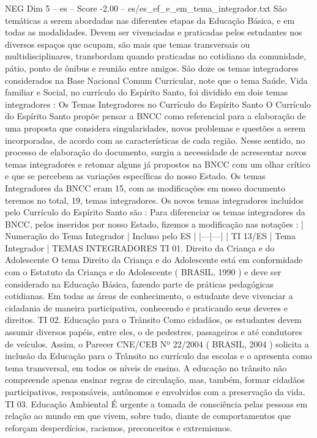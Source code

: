 \begin{textsample}{NEG Dim 5 – es – Score -2.00 – es/es\_ef\_e\_em\_tema\_integrador.txt}
São temáticas a serem abordadas nas diferentes etapas da Educação Básica, e em todas as modalidades.
Devem ser vivenciadas e praticadas pelos estudantes nos diversos espaços que ocupam, são mais que temas transversais ou multidisciplinares, transbordam quando praticadas no cotidiano da comunidade, pátio, ponto de ônibus e reunião entre amigos.
São doze os temas integradores considerados na Base Nacional Comum Curricular, note que o tema Saúde, Vida familiar e Social, no currículo do Espírito Santo, foi dividido em dois temas integradores : Os Temas Integradores no Currículo do Espírito Santo O Currículo do Espírito Santo propõe pensar a BNCC como referencial para a elaboração de uma proposta que considera singularidades, novos problemas e questões a serem incorporadas, de acordo com as características de cada região.
Nesse sentido, no processo de elaboração do documento, surgiu a necessidade de acrescentar novos temas integradores e retomar alguns já propostos na BNCC com um olhar crítico e que se percebem as variações específicas do nosso Estado.
Os temas Integradores da BNCC eram 15, com as modificações em nosso documento teremos no total, 19, temas integradores.
Os novos temas integradores incluídos pelo Currículo do Espírito Santo são : Para diferenciar os temas integradores da BNCC, pelos inseridos por nosso Estado, fizemos a modificação nas notações : | Numeração do Tema Integrador | Incluso pelo ES | |---|---| | TI 13/ES | Tema Integrador | TEMAS INTEGRADORES TI 01.
Direito da Criança e do Adolescente O tema Direito da Criança e do Adolescente está em conformidade com o Estatuto da Criança e do Adolescente ( BRASIL, 1990 ) e deve ser considerado na Educação Básica, fazendo parte de práticas pedagógicas cotidianas.
Em todas as áreas de conhecimento, o estudante deve vivenciar a cidadania de maneira participativa, conhecendo e praticando seus deveres e direitos.
TI 02.
Educação para o Trânsito Como cidadãos, os estudantes devem assumir diversos papéis, entre eles, o de pedestres, passageiros e até condutores de veículos.
Assim, o Parecer CNE/CEB Nº 22/2004 ( BRASIL, 2004 ) solicita a inclusão da Educação para o Trânsito no currículo das escolas e o apresenta como tema transversal, em todos os níveis de ensino.
A educação no trânsito não compreende apenas ensinar regras de circulação, mas, também, formar cidadãos participativos, responsáveis, autônomos e envolvidos com a preservação da vida.
TI 03.
Educação Ambiental É urgente a tomada de consciência pelas pessoas em relação ao mundo em que vivem, sobre tudo, diante de comportamentos que reforçam desperdícios, racismos, preconceitos e extremismos.

\end{textsample}
